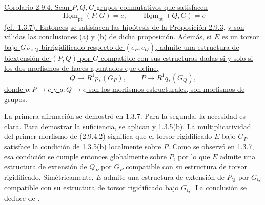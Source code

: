 \noindent\uline{Corolario 2.9.4. Sean $P,Q,G$ grupos conmutativos que
satisfacen}
\begin{equation}\tag{2.9.4.1}
 \underline{\operatorname{Hom}}_{\mathrm{pt}}(P,G)=e,
 \qquad
 \underline{\operatorname{Hom}}_{\mathrm{pt}}(Q,G)=e
\end{equation}
\uline{(cf.\ 1.3.7). Entonces}
%
{\uline{se satisfacen las hipótesis de la Proposición 2.9.3}},
\uline{y son válidas las conclusiones (a) y (b) de dicha proposición.
Además, si $E$ es un torsor bajo $G_{P\times Q}$ birrigidificado
respecto de $(e_P,e_Q)$, admite una estructura de biextensión de
$(P,Q)$ por $G$ compatible con sus estructuras dadas si y solo si los
dos morfismos de haces apuntados que define,}
\begin{equation}\tag{2.9.4.2}
 Q\longrightarrow R^1p_*(G_P),
 \qquad
 P\longrightarrow R^1q_*(G_Q),
\end{equation}
\uline{donde $p:P\longrightarrow e$ y $q:Q\longrightarrow e$ son
los morfismos estructurales, son morfismos de grupos.}

La primera afirmación se demostró en 1.3.7. Para la segunda, la
necesidad es clara. Para demostrar la suficiencia, se aplican
 y 1.3.5(b). La
multiplicatividad del primer morfismo de (2.9.4.2) significa que el
torsor rigidificado $E$ bajo $G_P$ satisface la condición de 1.3.5(b)
\underline{localmente sobre $P$}. Como se observó en 1.3.7, esa
condición se cumple entonces globalmente sobre $P$, por lo que $E$
admite una estructura de extensión de $Q_P$ por $G_P$ compatible con
su estructura de torsor rigidificado. Simétricamente, $E$ admite una
estructura de extensión de $P_Q$ por $G_Q$ compatible con su
estructura de torsor rigidificado bajo $G_Q$. La conclusión se deduce
de .

